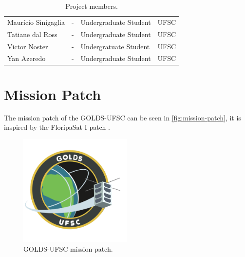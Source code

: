 \begin{table}[ht]
\begin{tabular}{lllc}
        Maurício Sinigaglia                 & -         & Undergraduate Student & UFSC \\
        Tatiane dal Ross                    & -         & Undergraduate Student & UFSC \\
        Victor Noster                       & -         & Undergratuate Student & UFSC \\
        Yan Azeredo                         & -         & Undergraduate Student & UFSC \\
        \bottomrule[1.5pt]
    \end{tabular}
    \caption{Project members.}
    \label{tab:team-members}
\end{table}

\section{Mission Patch}

The mission patch of the GOLDS-UFSC can be seen in \autoref{fig:mission-patch}, it is inspired by the FloripaSat-I patch \cite{floripasat}.

\begin{figure}[!ht]
    \begin{center}
        \includegraphics[width=0.5\textwidth]{figures/golds-ufsc-patch.png}
        \caption{GOLDS-UFSC mission patch.}
        \label{fig:mission-patch}
    \end{center}
\end{figure}

